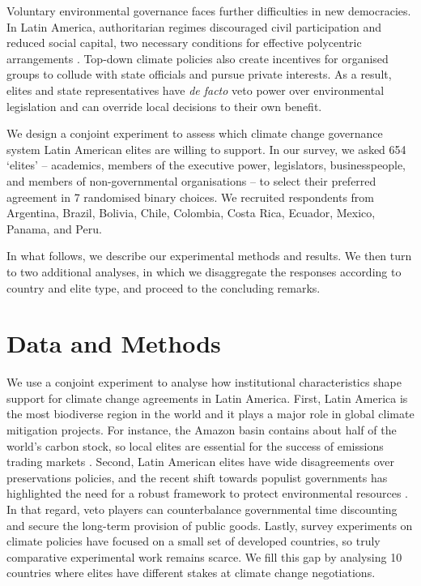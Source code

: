 \documentclass[a4paper,12pt]{article}
\begin{document}
Voluntary environmental governance faces further difficulties in new democracies. In Latin America, authoritarian regimes discouraged civil participation and reduced social capital, two necessary conditions for effective polycentric arrangements \citep{aligica2014institutional,ostrom1990governing}. Top-down climate policies also create incentives for organised groups to collude with state officials and pursue private interests. As a result, elites and state representatives have \textit{de facto} veto power over environmental legislation and can override local decisions to their own benefit.

We design a conjoint experiment to assess which climate change governance system Latin American elites are willing to support. In our survey, we asked 654 `elites' -- academics, members of the executive power, legislators, businesspeople, and members of non-governmental organisations -- to select their preferred agreement in 7 randomised binary choices. We recruited respondents from Argentina, Brazil, Bolivia, Chile, Colombia, Costa Rica, Ecuador, Mexico, Panama, and Peru.

In what follows, we describe our experimental methods and results. We then turn to two additional analyses, in which we disaggregate the responses according to country and elite type, and proceed to the concluding remarks.

\section{Data and Methods}%
\label{sec:data_and_methods}

We use a conjoint experiment to analyse how institutional characteristics shape support for climate change agreements in Latin America. First, Latin America is the most biodiverse region in the world and it plays a major role in global climate mitigation projects. For instance, the Amazon basin contains about half of the world's carbon stock, so local elites are essential for the success of emissions trading markets \citep{yang2018post}. Second, Latin American elites have wide disagreements over preservations policies, and the recent shift towards populist governments has highlighted the need for a robust framework to protect environmental resources \citep{ellner2019pinktide}. In that regard, veto players can counterbalance governmental time discounting and secure the long-term provision of public goods. Lastly, survey experiments on climate policies have focused on a small set of developed countries, so truly comparative experimental work remains scarce. We fill this gap by analysing 10 countries where elites have different stakes at climate change negotiations.  
\end{document}
